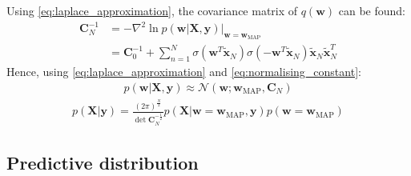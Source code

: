 \documentclass[a4paper]{article}
\begin{document}
    Using \autoref{eq:laplace_approximation}, the covariance matrix of $q(\bm{w})$ can be found:
    \begin{align}
        \bm{C}_N^{-1} &= -\nabla^2 \ln p(\bm{w} | \bm{X}, \bm{y}) \big|_{\bm{w} =\bm{w}_{\text{MAP}}} \nonumber \\
        &= \bm{C}_0^{-1}
        + \sum_{n=1}^N \sigma(\bm{w}^T \tilde{\bm{x}}_N) \sigma(-\bm{w}^T \tilde{\bm{x}}_N)\tilde{\bm{x}}_N\tilde{\bm{x}}_N^T
    \end{align}
    Hence, using \autoref{eq:laplace_approximation} and \autoref{eq:normalising_constant}:
    \begin{align}
        p(\bm{w} | \bm{X}, \bm{y}) \approx \mathcal{N}(\bm{w}; \bm{w}_\text{MAP}, \bm{C}_N)
    \end{align}
    \begin{align}
        p(\bm{X} | \bm{y}) = \frac{(2\pi)^\frac{N}{2}}{\det \bm{C}_N^{-\frac{1}{2}}}
                            p(\bm{X} | \bm{w} = \bm{w}_\text{MAP}, \bm{y}) p(\bm{w} = \bm{w}_\text{MAP})
    \end{align}

    \subsection{Predictive distribution}
\end{document}
